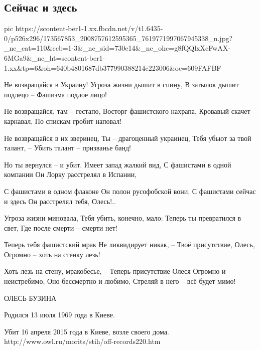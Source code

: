  
 
 
 
 

\subsection{Сейчас и здесь}


\ifcmt
  pic https://scontent-ber1-1.xx.fbcdn.net/v/t1.6435-0/p526x296/173567853_2008757612595365_7619771997067945338_n.jpg?_nc_cat=110&ccb=1-3&_nc_sid=730e14&_nc_ohc=g8fQQlxXcFwAX-6MGa9&_nc_ht=scontent-ber1-1.xx&tp=6&oh=640b4801687db377990388214c223006&oe=609FAFBF
\fi

Не возвращайся в Украину!
Угроза жизни дышит в спину,
В затылок дышит подлецо –
Фашизма подлое лицо!

Не возвращайся, там – гестапо,
Восторг фашистского нахрапа,
Кровавый скачет карнавал,
По спискам гробит наповал!

Не возвращайся в их зверинец,
Ты – драгоценный украинец,
Тебя убьют за твой талант, –
Убить талант – призванье банд!

Но ты вернулся – и убит.
Имеет запад жалкий вид,
С фашистами в одной компании
Он Лорку расстрелял в Испании,

С фашистами в одном флаконе
Он полон русофобской вони,
С фашистами сейчас и здесь
Он расстрелял тебя, Олесь!..

Угроза жизни миновала,
Тебя убить, конечно, мало:
Теперь ты превратился в свет,
Где после смерти – смерти нет!

Теперь тебя фашистский мрак
Не ликвидирует никак, –
Твоё присутствие, Олесь,
Огромно – хоть на стенку лезь!

Хоть лезь на стену, мракобесье, –
Теперь присутствие Олеся
Огромно и неистребимо,
Оно бессмертно и любимо,
Стреляй в него – всё будет мимо!

ОЛЕСЬ БУЗИНА

Родился 13 июля 1969 года в Киеве.

Убит 16 апреля 2015 года в Киеве, возле своего дома.
http://www.owl.ru/morits/stih/off-records220.htm

